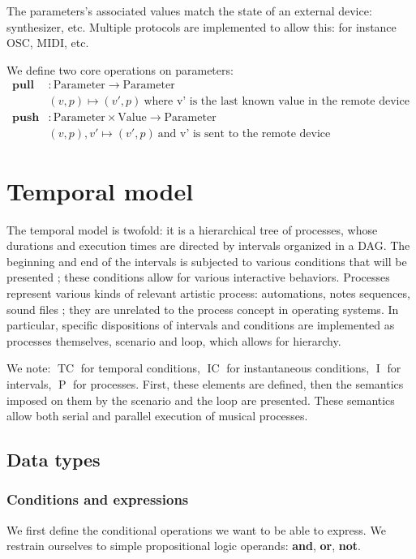 \documentclass[applsci,article,submit,moreauthors,pdftex,10pt,a4paper]{mdpi}
\DeclareMathOperator{\tc}{TC}
\DeclareMathOperator{\ic}{IC}
\DeclareMathOperator{\itv}{I}
\DeclareMathOperator{\proc}{P}
\begin{document}
The parameters's associated values match the state of an external device: synthesizer, etc.
Multiple protocols are implemented to allow this: for instance OSC, MIDI, etc.

We define two core operations on parameters: 
\begin{align*}
\mathbf{pull} & : \mathrm{Parameter} \rightarrow \mathrm{Parameter} \\
              & (v, p) \mapsto (v', p)~\text{where v' is the last known value in the remote device}\\
\mathbf{push} &: \mathrm{Parameter} \times \mathrm{Value} \rightarrow \mathrm{Parameter} \\
              & (v, p), v' \mapsto (v', p)~\text{and v' is sent to the remote device} 
\end{align*}

\section{Temporal model}\label{sec.temporal}
The temporal model is twofold: it is a hierarchical tree of processes, whose durations and execution times are directed by intervals organized in a \ac{DAG}. 
The beginning and end of the intervals is subjected to various conditions that will be presented ; these conditions allow for various 
interactive behaviors. Processes represent various kinds of relevant artistic process: automations, notes sequences, sound files ; they are unrelated to the process concept in operating systems. 
In particular, specific dispositions of intervals and conditions are implemented as processes themselves, scenario and loop, which allows for hierarchy.

We note: $\tc$ for temporal conditions, $\ic$ for instantaneous conditions, $\itv$ for intervals, $\proc$ for processes. 
First, these elements are defined, then the semantics imposed on them by the scenario and the loop are presented.
These semantics allow both serial and parallel execution of musical processes.

\subsection{Data types}   
    
\subsubsection{Conditions and expressions}
We first define the conditional operations we want to be able to express.
We restrain ourselves to simple propositional logic operands: \textbf{and}, \textbf{or}, \textbf{not}.
\end{document}
